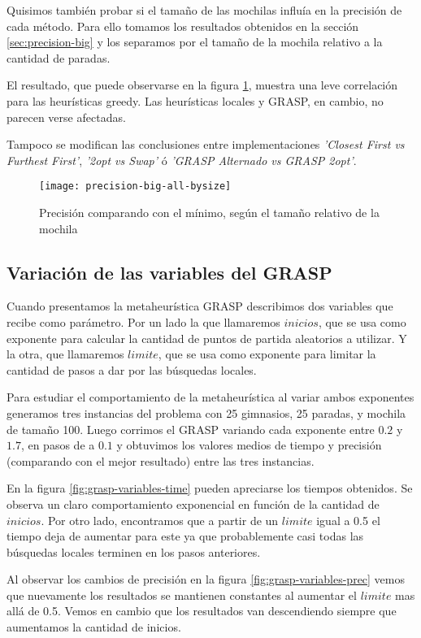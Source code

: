 Quisimos también probar si el tamaño de las mochilas influía en la precisión de cada método.
Para ello tomamos los resultados obtenidos en la sección \ref{sec:precision-big} y los separamos
por el tamaño de la mochila relativo a la cantidad de paradas.

El resultado, que puede observarse en la figura \ref{fig:precision-big-all-bysize},
muestra una leve correlación para las heurísticas greedy. Las heurísticas locales y GRASP, en cambio, no parecen verse afectadas.

Tampoco se modifican las conclusiones entre implementaciones \emph{'Closest First vs Furthest First'}, \emph{'2opt vs Swap'} ó \emph{'GRASP Alternado vs GRASP 2opt'}.

\begin{figure}[H]
    \centering
    \texttt{[image: precision-big-all-bysize]}
    \caption{Precisión comparando con el mínimo, según el tamaño relativo de la mochila}
    \label{fig:precision-big-all-bysize}
\end{figure}

\subsection{Variación de las variables del GRASP}

Cuando presentamos la metaheurística GRASP describimos dos variables que recibe como parámetro.
Por un lado la que llamaremos $inicios$, que se usa como exponente para calcular la cantidad de puntos de partida aleatorios a utilizar.
Y la otra, que llamaremos $limite$, que se usa como exponente para limitar la cantidad de pasos a dar por las búsquedas locales.

Para estudiar el comportamiento de la metaheurística al variar ambos exponentes generamos tres instancias del problema con 25 gimnasios,
25 paradas, y mochila de tamaño 100. Luego corrimos el GRASP variando cada exponente entre $0.2$ y $1.7$, en pasos de a $0.1$ y obtuvimos
los valores medios de tiempo y precisión (comparando con el mejor resultado) entre las tres instancias.

En la figura \ref{fig:grasp-variables-time} pueden apreciarse los tiempos obtenidos.
Se observa un claro comportamiento exponencial en función de la cantidad de $inicios$.
Por otro lado, encontramos que a partir de un $limite$ igual a 0.5 el tiempo deja de aumentar para este ya que
probablemente casi todas las búsquedas locales terminen en los pasos anteriores.

Al observar los cambios de precisión en la figura \ref{fig:grasp-variables-prec} vemos que nuevamente los resultados se mantienen constantes
al aumentar el $limite$ mas allá de 0.5. Vemos en cambio que los resultados van descendiendo siempre que aumentamos
la cantidad de inicios.

